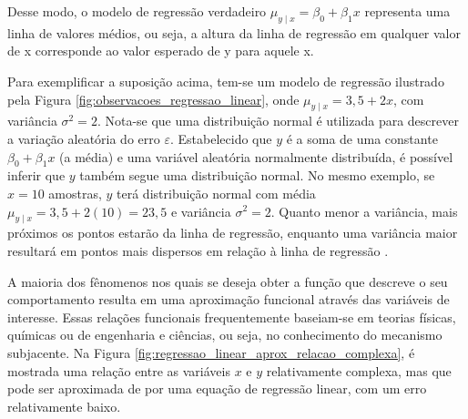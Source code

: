 Desse modo, o modelo de regressão verdadeiro $\mu_{y \mid x} = \beta_0 + \beta_1x$ representa uma linha de valores médios, ou seja, a altura da linha de regressão em qualquer valor de x corresponde ao valor esperado de y para aquele x.

Para exemplificar a suposição acima, tem-se um modelo de regressão ilustrado pela Figura \ref{fig:observacoes_regressao_linear}, onde $\mu_{y \mid x} = 3,5 + 2x$, com variância $\sigma^2 = 2$. Nota-se que uma distribuição normal é utilizada para descrever a variação aleatória do erro $\varepsilon$. Estabelecido que $y$ é a soma de uma constante $\beta_0 + \beta_1x$ (a média) e uma variável aleatória normalmente distribuída, é possível inferir que $y$ também segue uma distribuição normal. No mesmo exemplo, se $x = 10$ amostras, $y$ terá distribuição normal com média $\mu_{y \mid x} = 3,5 + 2(10) = 23,5$ e variância $\sigma^2 = 2$. Quanto menor a variância, mais próximos os pontos estarão da linha de regressão, enquanto uma variância maior resultará em pontos mais dispersos em relação à linha de regressão \cite{montgomery2012}.

A maioria dos fênomenos nos quais se deseja obter a função que descreve o seu comportamento resulta em uma aproximação funcional através das variáveis de interesse. Essas relações funcionais frequentemente baseiam-se em teorias físicas, químicas ou de engenharia e ciências, ou seja, no conhecimento do mecanismo subjacente. Na Figura \ref{fig:regressao_linear_aprox_relacao_complexa}, é mostrada uma relação entre as variáveis $x$ e $y$ relativamente complexa, mas que pode ser aproximada de por uma equação de regressão linear, com um erro relativamente baixo.

